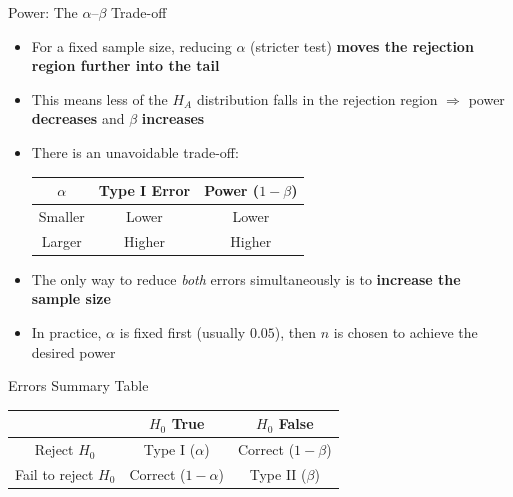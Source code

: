 \documentclass[12pt, aspectratio=169]{beamer}
\begin{document}
    \begin{frame}{Power: The $\alpha$--$\beta$ Trade-off}
        \begin{itemize}
            \item For a fixed sample size, reducing $\alpha$ (stricter test)
                \textbf{moves the rejection region further into the tail}
            \item This means less of the $H_A$ distribution falls in the rejection region
                $\Rightarrow$ power \textbf{decreases} and $\beta$ \textbf{increases}
            \item There is an unavoidable trade-off:
            \begin{center}
                \begin{tabular}{ccc}
                    \toprule
                    $\alpha$ & Type I Error & Power ($1-\beta$) \\
                    \midrule
                    Smaller & Lower  & Lower \\
                    Larger  & Higher & Higher \\
                    \bottomrule
                \end{tabular}
            \end{center}
            \item The only way to reduce \emph{both} errors simultaneously is to
                \textbf{increase the sample size}
            \item In practice, $\alpha$ is fixed first (usually $0.05$),
                then $n$ is chosen to achieve the desired power
        \end{itemize}
    \end{frame}

    
    \begin{frame}{Errors Summary Table}
        \begin{center}
            \begin{tabular}{c|cc}
                \hline
                & $H_0$ True & $H_0$ False \\
                \hline
                Reject $H_0$ & Type I ($\alpha$) & Correct ($1-\beta$) \\
                Fail to reject $H_0$ & Correct ($1-\alpha$) & Type II ($\beta$) \\
                \hline
            \end{tabular}
        \end{center}
    \end{frame}
\end{document}
